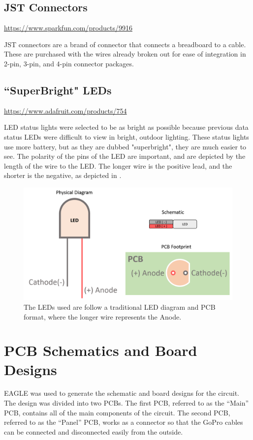 \subsection{JST Connectors}

\url{https://www.sparkfun.com/products/9916}\vspace{0.5em}

JST connectors are a brand of connector that connects a breadboard to a cable.  These are purchased with the wires already broken out for ease of integration in 2-pin, 3-pin, and 4-pin connector packages.  
\subsection{``SuperBright" LEDs}

\url{https://www.adafruit.com/products/754}\vspace{0.5em}

LED status lights were selected to be as bright as possible because previous data status LEDs were difficult to view in bright, outdoor lighting.  These status lights use more battery, but as they are dubbed "superbright", they are much easier to see.  The polarity of the pins of the LED are important, and are depicted by the length of the wire to the LED.  The longer wire is the positive lead, and the shorter is the negative, as depicted in .  

\begin{figure}[h]
	\centering
	\includegraphics[width = .75\linewidth]{../figures/LED.png}
	\caption{The LEDs used are follow a traditional LED diagram and PCB format, where the longer wire represents the Anode.}
	\label{fig:led}
\end{figure}

\section{PCB Schematics and Board Designs}
EAGLE was used to generate the schematic and board designs for the circuit.  The design was divided into two PCBs.  The first PCB, referred to as the ``Main'' PCB, contains all of the main components of the circuit.  The second PCB, referred to as the ``Panel'' PCB, works as a connector so that the GoPro cables can be connected and disconnected easily from the outside.  
